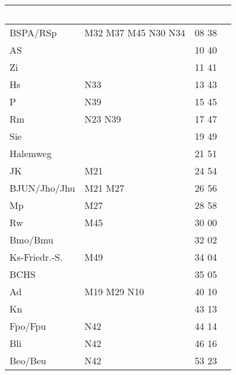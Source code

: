 \begin{tabular}{!{\color{schiefergrau}\vrule width 3pt}*{4}{l!{\color{schiefergrau}\vrule width 3pt}}}
\hline
{}
 & \textcolor{white}{\bfseries WE} \\
\hline
BSPA/RSp     & \mbus{} M32 M37 M45 \nbus{} N30 N34         & 08 38 &       \\
AS           &                                             & 10 40 &       \\
Zi           &                                             & 11 41 &       \\
Hs           & \nbus{} N33                                 & 13 43 &       \\
P            & \nbus{} N39                                 & 15 45 &       \\
Rm           & \nbus{} N23 N39                             & 17 47 &       \\
Sie          &                                             & 19 49 &       \\
Halemweg     &                                             & 21 51 &       \\
JK           & \mbus{} M21                                 & 24 54 &       \\
BJUN/Jho/Jhu & \mbus{} M21 M27                             & 26 56 &       \\
Mp           & \mbus{} M27                                 & 28 58 &       \\
Rw           & \mbus{} M45                                 & 30 00 &       \\
Bmo/Bmu      & \nuzwei{}                                   & 32 02 &       \\
Ks-Friedr.-S.& \mbus{} M49                                 & 34 04 &       \\
BCHS         &                                             & 35 05 &       \\
Ad           & \mbus{} M19 M29 \nbus{} N10                 & 40 10 &       \\
Kn           &                                             & 43 13 &       \\
Fpo/Fpu      & \nudrei{} \nbus{} N42                       & 44 14 &       \\
Bli          & \nbus{} N42                                 & 46 16 &       \\
Beo/Beu      & \nuneun{} \nbus{} N42                       & 53 23 &       \\

\end{tabular}
